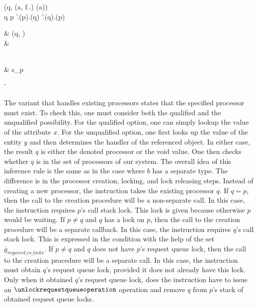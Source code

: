 \begin{forjournal}
{{					{\nooperation}
					{\issueoperation(q, \evaluateoperation(a, f.\classtypefeature.\invariantfeature) \statementseparator \waitoperation(a))} \statementseparator \\
				\multilineconditionaloperation
					{q \neq p \wedge \neg \state'.\requestqueuelocksfeature(p).\containsfeature(q) \wedge \neg \state'.\requestqueuelocksfeature(q).\containsfeature(p)}
					{
						\begin{split}
							& \issueoperation(q, \unlockrequestqueueoperation) \statementseparator \\
							& \popobtainedrequestqueuelocksoperation 
						\end{split}
					}
					{\nooperation} \statementseparator \\
				& s_{p}
			}
			{\state'}
	}
 \end{forjournal}

The variant that handles existing processors states that the specified processor must exist. To check this, one must consider both the qualified and the unqualified possibility. For the qualified option, one can simply lookup the value of the attribute $x$. For the unqualified option, one first looks up the value of the entity $y$ and then determines the handler of the referenced object. In either case, the result $q$ is either the denoted processor or the void value. One then checks whether $q$ is in the set of processors of our system. The overall idea of this inference rule is the same as in the case where $b$ has a separate type. The difference is in the processor creation, locking, and lock releasing steps. Instead of creating a new processor, the instruction takes the existing processor $q$. If $q = p$, then the call to the creation procedure will be a non-separate call. In this case, the instruction requires $p$'s call stack lock. This lock is given because otherwise $p$ would be waiting. If $p \neq q$ and $q$ has a lock on $p$, then the call to the creation procedure will be a separate callback. In this case, the instruction requires $q$'s call stack lock. This is expressed in the condition with the help of the set $\overline{g}_{required\_cs\_locks}$. If $p \neq q$ and $q$ does not have $p$'s request queue lock, then the call to the creation procedure will be a separate call. In this case, the instruction must obtain $q$'s request queue lock, provided it does not already have this lock. Only when it obtained $q$'s request queue lock, does the instruction have to issue an $\unlockrequestqueueoperation$ operation and remove $q$ from $p$'s stack of obtained request queue locks.

